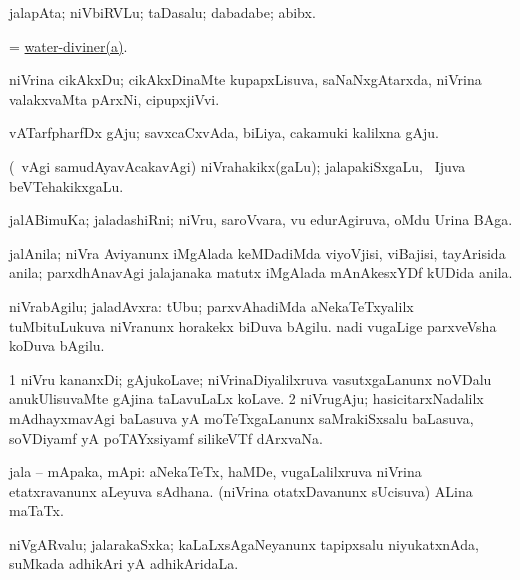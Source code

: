 \bentry
{} 
\gl{\nA}
\expl{}
\bmng
jalapAta; niVbiRVLu; taDasalu; dabadabe; abibx. 
\emng
\eentry

\bentry
{} 
\gl{\nA}
\expl{}
\bmng
= \hyperlink{water-diviner}{water-diviner(a)}. 
\emng
\eentry

\bentry
{} 
\gl{\nA}
\expl{}
\bmng
niVrina cikAkxDu; cikAkxDinaMte kupapxLisuva, saNaNxgAtarxda, niVrina valakxvaMta pArxNi, cipupxjiVvi. 
\emng
\eentry

\bentry
{} 
\gl{\nA}
\expl{}
\bmng
vATarfpharfDx gAju; savxcaCxvAda, biLiya, cakamuki kalilxna gAju. 
\emng
\eentry

\bentry
{} 
\gl{\nA}
\expl{}
\bmng
(\sA\ \bava vAgi samudAyavAcakavAgi) niVrahakikx(gaLu); jalapakiSxgaLu, \kanmu\ Ijuva beVTehakikxgaLu. 
\emng
\eentry

\bentry
{} 
\gl{\nA}
\expl{}
\bmng
jalABimuKa; jaladashiRni; niVru, saroVvara, \mo vu edurAgiruva, oMdu Urina BAga. 
\emng
\eentry

\bentry
{} 
\gl{\nA}
\expl{}
\bmng
jalAnila; niVra Aviyanunx iMgAlada keMDadiMda viyoVjisi, viBajisi, tayArisida anila; parxdhAnavAgi jalajanaka matutx iMgAlada mAnAkesxYDf kUDida anila. 
\emng
\eentry

\bentry
{} 
\gl{\nA}
\expl{}
\bmng
niVrabAgilu; jaladAvxra: 
\banum
{} tUbu; parxvAhadiMda aNekaTeTxyalilx tuMbituLukuva niVranunx horakekx biDuva bAgilu. 
 nadi \mo vugaLige parxveVsha koDuva bAgilu. 
\eanum
\emng
\eentry

\bentry
{} 
\gl{\nA}
\expl{}
\bmng
\bnum
\num{1} niVru kananxDi; gAjukoLave; niVrinaDiyalilxruva vasutxgaLanunx noVDalu anukUlisuvaMte gAjina taLavuLaLx koLave. 
\num{2} niVrugAju; hasicitarxNadalilx mAdhayxmavAgi baLasuva yA moTeTxgaLanunx saMrakiSxsalu baLasuva, soVDiyamf yA poTAYxsiyamf silikeVTf dArxvaNa. 
\enum
\emng
\eentry

\bentry
{} 
\gl{\nA}
\expl{}
\bmng
jala -- mApaka, mApi: 
\banum
{} aNekaTeTx, haMDe, \mo vugaLalilxruva niVrina etatxravanunx aLeyuva sAdhana. 
 (niVrina otatxDavanunx sUcisuva) ALina maTaTx. 
\eanum
\emng
\eentry

\bentry
{} 
\gl{\nA}
\expl{}
\bmng
niVgARvalu; jalarakaSxka; kaLaLxsAgaNeyanunx tapipxsalu niyukatxnAda, suMkada adhikAri yA adhikAridaLa. 
\emng
\eentry

